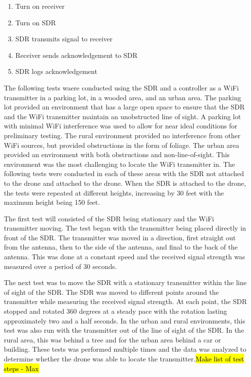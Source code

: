 \begin{enumerate}
   \item Turn on receiver
   \item Turn on SDR
   \item SDR transmits signal to receiver
   \item Receiver sends acknowledgement to SDR
   \item SDR logs acknowledgement
\end{enumerate}


\par 

The following tests waere conducted using the SDR and a controller as a WiFi transmitter in a parking lot, in a wooded area, and an urban area. The parking lot provided an environment that has a large open space to ensure that the SDR and the WiFi transmitter maintain an unobstructed line of sight. A parking lot with minimal WiFi interference was used to allow for near ideal conditions for preliminary testing. The rural environment provided no interference from other WiFi sources, but provided obstructions in the form of foliage. The urban area provided an environment with both obstructions and non-line-of-sight. This environment was the most challenging to locate the WiFi transmitter in. The following tests were conducted in each of these areas with the SDR not attached to the drone and attached to the drone. When the SDR is attached to the drone, the tests were repeated at different heights, increasing by 30 feet with the maximum height being 150 feet.\par 
The first test will consisted of the SDR being stationary and the WiFi transmitter moving. The test began with the transmitter being placed directly in front of the SDR. The transmitter was moved in a direction, first straight out from the antenna, then to the side of the antenna, and final to the back of the antenna. This was done at a constant speed and the received signal strength was measured over a period of 30 seconds.\par 
The next test was to move the SDR with a stationary transmitter within the line of sight of the SDR. The SDR was moved to different points around the transmitter while measuring the received signal strength. At each point, the SDR stopped and rotated 360 degrees at a steady pace with the rotation lasting approximately two and a half seconds. In the urban and rural environments, this test was also run with the transmitter out of the line of sight of the SDR. In the rural area, this was behind a tree and for the urban area behind a car or building. These tests was performed multiple times and the data was analyzed to determine whether the drone was able to locate the transmitter.\hl{Make list of test steps - Max} \par 

